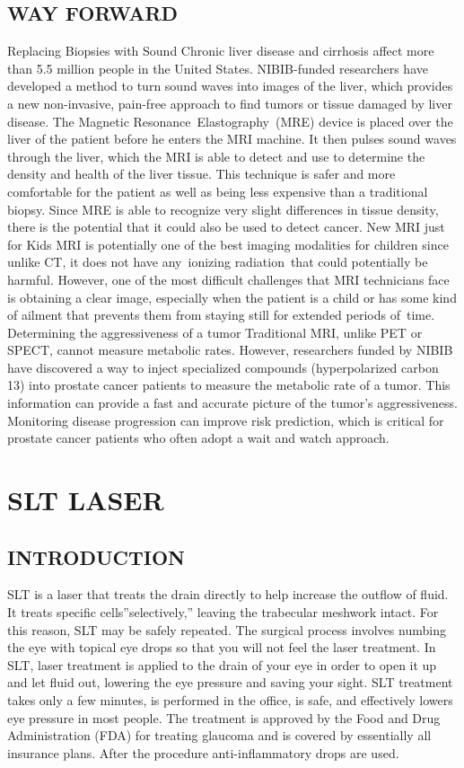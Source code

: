 \documentclass[12pt]{article}
\begin{document}
\subsection{WAY FORWARD}
Replacing Biopsies with Sound Chronic liver disease and cirrhosis affect more than 5.5 million people in the United States. NIBIB-funded researchers have developed a method to turn sound waves into images of the liver, which provides a new non-invasive, pain-free approach to find tumors or tissue damaged by liver disease. The Magnetic Resonance Elastography (MRE) device is placed over the liver of the patient before he enters the MRI machine. It then pulses sound waves through the liver, which the MRI is able to detect and use to determine the density and health of the liver tissue. This technique is safer and more comfortable for the patient as well as being less expensive than a traditional biopsy. Since MRE is able to recognize very slight differences in tissue density, there is the potential that it could also be used to detect cancer.
New MRI just for Kids MRI is potentially one of the best imaging modalities for children since unlike CT, it does not have any ionizing radiation that could potentially be harmful. However, one of the most difficult challenges that MRI technicians face is obtaining a clear image, especially when the patient is a child or has some kind of ailment that prevents them from staying still for extended periods of time.
Determining the aggressiveness of a tumor Traditional MRI, unlike PET or SPECT, cannot measure metabolic rates. However, researchers funded by NIBIB have discovered a way to inject specialized compounds (hyperpolarized carbon 13) into prostate cancer patients to measure the metabolic rate of a tumor. This information can provide a fast and accurate picture of the tumor’s aggressiveness. Monitoring disease progression can improve risk prediction, which is critical for prostate cancer patients who often adopt a wait and watch approach.




\section{SLT LASER}




\subsection{INTRODUCTION}
SLT is a laser that treats the drain directly to help increase the outflow of fluid. It treats specific cells”selectively,” leaving the trabecular meshwork intact. For this reason, SLT may be safely repeated. The surgical process involves numbing the eye with topical eye drops so that you will not feel the laser treatment. In SLT, laser treatment is applied to the drain of your eye in order to open it up and let fluid out, lowering the eye pressure and saving your sight. SLT treatment takes only a few minutes, is performed in the office, is safe, and effectively lowers eye pressure in most people. The treatment is approved by the Food and Drug Administration (FDA) for treating glaucoma and is covered by essentially all insurance plans. After the procedure anti-inflammatory drops are used.
\end{document}
